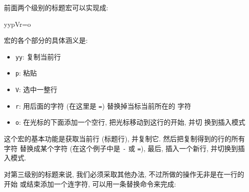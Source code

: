 前面两个级别的标题宏可以实现成:
\begin{vimcode}
yypVr=o
\end{vimcode}
宏的各个部分的具体涵义是:
\begin{itemize}
    \item \texttt{yy}: 复制当前行
    \item \texttt{p}: 粘贴
    \item \texttt{V}: 选中一整行
    \item \texttt{r}: 用后面的字符 (在这里是 \texttt{=}) 替换掉当标当前所在的
        字符
    \item \texttt{o}: 在光标的下面添加一个空行, 把光标移动到这行的开始, 并切
        换到插入模式
\end{itemize}

这个宏的基本功能是获取当前行 (标题行), 并复制它. 然后把复制得到的行的所有字符
替换成某个字符 (在这个例子中是 \texttt{-} 或 \texttt{=}), 最后, 插入一个新行,
并切换到插入模式.

对第三级别的标题来说, 我们必须采取其他办法, 不过所做的操作无非是在一行的开始
或结束添加一个连字符, 可以用一条替换命令来完成:
